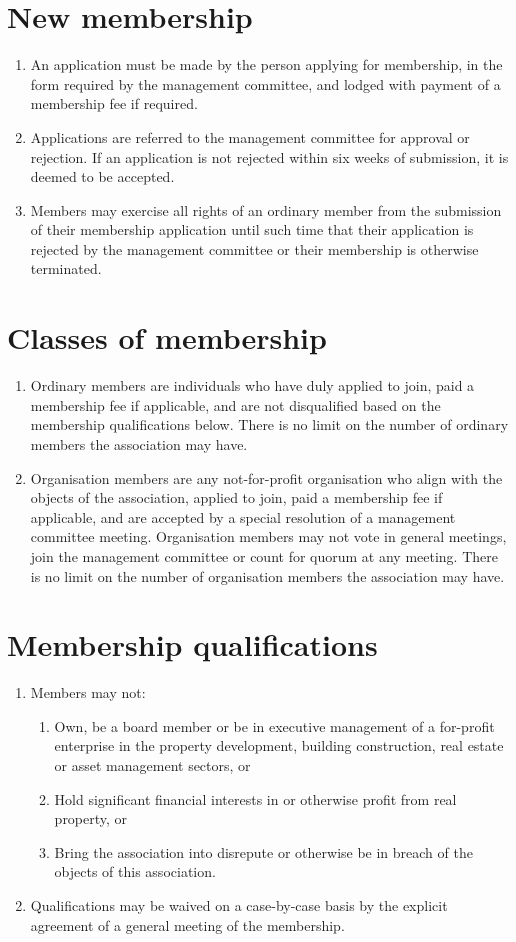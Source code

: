 \documentclass[11pt, oneside]{article}
\begin{document}
\section{New membership}
\begin{enumerate}

\item An application must be made by the person applying for membership, in the form required by the management committee, and lodged with payment of a membership fee if required. 
\item Applications are referred to the management committee for approval or rejection. If an application is not rejected within six weeks of submission, it is deemed to be accepted. 
\item Members may exercise all rights of an ordinary member from the submission of their membership application until such time that their application is rejected by the management committee or their membership is otherwise terminated. 
\end{enumerate}

\section{Classes of membership}
\begin{enumerate}
\item Ordinary members are individuals who have duly applied to join, paid a membership fee if applicable, and are not disqualified based on the membership qualifications below. There is no limit on the number of ordinary members the association may have.
\item Organisation members are any not-for-profit organisation who align with the objects of the association, applied to join, paid a membership fee if applicable, and are accepted by a special resolution of a management committee meeting. Organisation members may not vote in general meetings, join the management committee or count for quorum at any meeting. There is no limit on the number of organisation members the association may have. 
\end{enumerate}
\section{Membership qualifications}
\begin{enumerate}
\item Members may not:
\begin{enumerate}
\item Own, be a board member or be in executive management of a for-profit enterprise in the property development, building construction, real estate or asset management sectors, or
\item Hold significant financial interests in or otherwise profit from real property, or
\item Bring the association into disrepute or otherwise be in breach of the objects of this association.
\end{enumerate}
\item Qualifications may be waived on a case-by-case basis by the explicit agreement of a general meeting of the membership. 
\end{enumerate}
\end{document}
